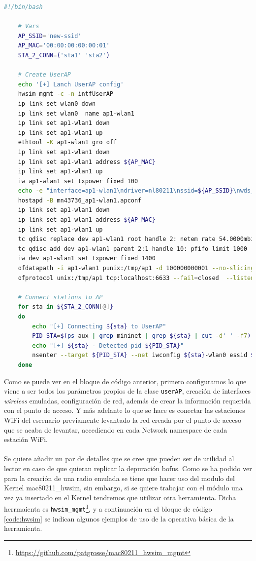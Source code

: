 \begin{lstlisting}[language= bash, style=Consola, caption={Script de puesta en marcha del escenario -  launch.sh},label=code:launch]
    #!/bin/bash

    # Vars
    AP_SSID='new-ssid'
    AP_MAC='00:00:00:00:00:01'
    STA_2_CONN=('sta1' 'sta2')

    # Create UserAP
    echo '[+] Lanch UserAP config'
    hwsim_mgmt -c -n intfUserAP
    ip link set wlan0 down
    ip link set wlan0  name ap1-wlan1
    ip link set ap1-wlan1 down 
    ip link set ap1-wlan1 up
    ethtool -K ap1-wlan1 gro off 
    ip link set ap1-wlan1 down 
    ip link set ap1-wlan1 address ${AP_MAC}
    ip link set ap1-wlan1 up
    iw ap1-wlan1 set txpower fixed 100
    echo -e "interface=ap1-wlan1\ndriver=nl80211\nssid=${AP_SSID}\nwds_sta=1\nhw_mode=g\nchannel=1\nctrl_interface=/var/run/hostapd\nctrl_interface_group=0" > mn43736_ap1-wlan1.apconf
    hostapd -B mn43736_ap1-wlan1.apconf
    ip link set ap1-wlan1 down 
    ip link set ap1-wlan1 address ${AP_MAC}
    ip link set ap1-wlan1 up
    tc qdisc replace dev ap1-wlan1 root handle 2: netem rate 54.0000mbit latency 1.00ms
    tc qdisc add dev ap1-wlan1 parent 2:1 handle 10: pfifo limit 1000
    iw dev ap1-wlan1 set txpower fixed 1400
    ofdatapath -i ap1-wlan1 punix:/tmp/ap1 -d 100000000001 --no-slicing 1> /tmp/ap1-ofd.log 2> /tmp/ap1-ofd.log &
    ofprotocol unix:/tmp/ap1 tcp:localhost:6633 --fail=closed  --listen=punix:/tmp/ap1.listen 1> /tmp/ap1-ofp.log 2>/tmp/ap1-ofp.log &

    # Connect stations to AP
    for sta in ${STA_2_CONN[@]}
    do
        echo "[+] Connecting ${sta} to UserAP"
        PID_STA=$(ps aux | grep mininet | grep ${sta} | cut -d' ' -f7)
        echo "[+] ${sta} - Detected pid ${PID_STA}"
        nsenter --target ${PID_STA} --net iwconfig ${sta}-wlan0 essid ${AP_SSID} ap ${AP_MAC}
    done
\end{lstlisting}
\vspace{0.5cm}

Como se puede ver en el bloque de código anterior, primero configuramos lo que viene a ser todos los parámetros propios de la clase \texttt{userAP}, creación de interfaces \textit{wireless} emuladas, configuración de red, además de crear la información requerida con el punto de acceso. Y más adelante lo que se hace es conectar las estaciones WiFi del escenario previamente levantado la red creada por el punto de acceso que se acaba de levantar, accediendo en cada Network namespace de cada estación WiFi.\\
\\
Se quiere añadir un par de detalles que se cree que pueden ser de utilidad al lector en caso de que quieran replicar la depuración \gls{bofus}. Como se ha podido ver para la creación de una radio emulada se tiene que hacer uso del modulo del Kernel mac80211\_hwsim, sin embargo, si se quiere trabajar con el módulo una vez ya insertado en el Kernel tendremos que utilizar otra herramienta. Dicha herrmaienta es \texttt{hwsim\_mgmt}\footnote{\url{https://github.com/patgrosse/mac80211_hwsim_mgmt}}, y a continuación en el bloque de código \ref{code:hwsim} se indican algunos ejemplos de uso de la operativa básica de la herramienta.


